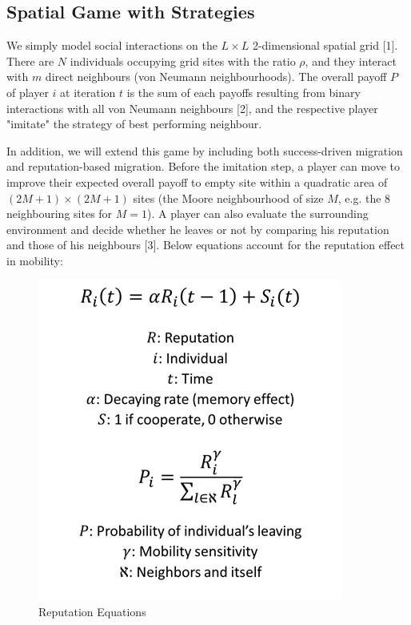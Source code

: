\documentclass[11pt]{article}
\begin{document}
\subsection{Spatial Game with Strategies}

We simply model social interactions on the $L \times L$ 2-dimensional spatial grid [1]. There are $N$ individuals occupying grid sites with the ratio $\rho$, and they interact with $m$ direct neighbours (von Neumann neighbourhoods). The overall payoff $P$ of player $i$ at iteration $t$ is the sum of each payoffs resulting from binary interactions with all von Neumann neighbours [2], and the respective player "imitate" the strategy of best performing neighbour.

In addition, we will extend this game by including both success-driven migration and reputation-based migration. Before the imitation step, a player can move to improve their expected overall payoff to empty site within a quadratic area of $(2M+1) \times (2M+1)$ sites (the Moore neighbourhood of size $M$, e.g. the 8 neighbouring sites for $M = 1$). A player can also evaluate the surrounding environment and decide whether he leaves or not by comparing his reputation and those of his neighbours [3]. Below equations account for the reputation effect in mobility:

\begin{figure}[!htbp]
	\centering
	\includegraphics[scale=0.7]{../../other/reputation_eq.png}
    \caption{Reputation Equations}
    \label{fig:reputationeq}
\end{figure}
\end{document}
